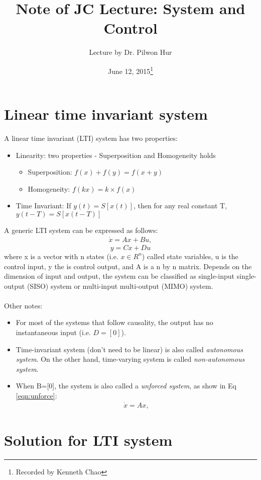 \documentclass{article}
\title{Note of JC Lecture: System and Control}
\author{Lecture by Dr. Pilwon Hur}
\date{June 12, 2015\footnote{Recorded by Kenneth Chao}}
\begin{document}
\maketitle
\section{Linear time invariant system}
A linear time invariant (LTI) system has two properties:
\begin{itemize}
 \item Linearity: two properties - Superposition and Homogeneity holds
 \begin{itemize}
 \item Superposition: $f(x)+f(y)=f(x+y)$
 \item Homogeneity: $f(kx)=k\times f(x)$
 \end{itemize} 
 \item Time Invariant: If $y(t) = S [x(t)]$, then for any real constant T, $ y(t-T) = S [x(t-T)]$
 \end{itemize}
A generic LTI system can be expressed as follows:
\begin{align}
\label{eqn:LTI}
\dot {x}={A}x+{B}u,
\end{align}
\[
y={C}x+{D}u\]
where x is a vector with n states (i.e. $x\in R^n$) called state variables, u is the control input, y the is control output, and A is a n by n matrix. Depends on the dimension of input and output, the system can be classified as single-input single-output (SISO) system or multi-input multi-output (MIMO) system.\\\\
Other notes:
 \begin{itemize}
 \item For most of the systems that follow causality, the output has no instantaneous input (i.e. $D=[0]$).
 \item Time-invariant system (don't need to be linear) is also called \emph{autonomous system}. On the other hand, time-varying system is  called \emph{non-autonomous system}.
\item When B=[0], the system is also called a \emph {unforced system}, as show in Eq \eqref{eqn:unforce}:
\begin{align}
\label{eqn:unforce}
\dot {x}={A}x,
\end{align}
\end{itemize} 

\section{Solution for LTI system}
\end{document}
